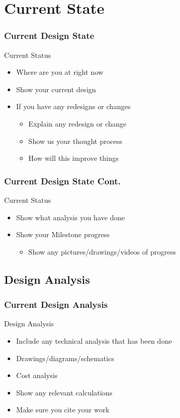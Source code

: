 \documentclass[11pt]{beamer}
\begin{document}
\section{Current State}
\begin{frame}
\frametitle{Current Design State}
\begin{block}{Current Status}
\begin{itemize}
\item Where are you at right now
\item Show your current design
\item If you have any redesigns or changes
\begin{itemize}
\item Explain any redesign or change
\item Show us your thought process
\item How will this improve things
\end{itemize}

\end{itemize}

\end{block}

\end{frame}

\begin{frame}
\frametitle{Current Design State Cont.}
\begin{block}{Current Status}
\begin{itemize}
\item Show what analysis you have done
\item Show your Milestone progress
\begin{itemize}
\item Show any pictures/drawings/videos of progress
\end{itemize}
\end{itemize}
\end{block}
\end{frame}
\subsection{Design Analysis}
\begin{frame}
\frametitle{Current Design Analysis}
\begin{block}{Design Analysis}
\begin{itemize}
\item Include any technical analysis that has been done
\item Drawings/diagrams/schematics
\item Cost analysis
\item Show any relevant calculations
\item Make sure you cite your work

\end{itemize}
\end{block}
\end{frame}
\end{document}

